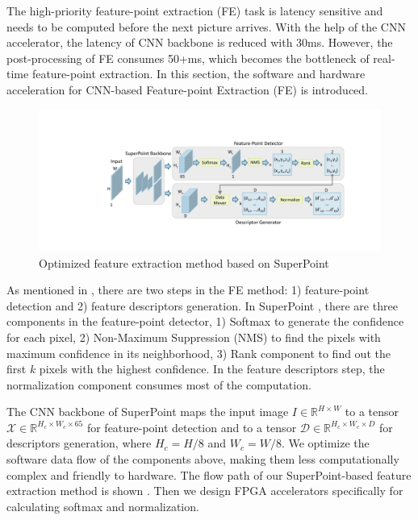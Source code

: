 \label{sec:hardsoftcodesign}
\label{subsec:FEopt}

The high-priority feature-point extraction (FE) task is latency sensitive and needs to be computed before the next picture arrives. With the help of the CNN accelerator, the latency of CNN backbone is reduced with 30ms. However, the  post-processing of FE consumes 50+ms, which becomes the bottleneck of real-time feature-point extraction. In this section, the software and hardware acceleration for CNN-based Feature-point Extraction (FE) is introduced.


\begin{figure}[t]
    \centering  
    \vspace{-0.1cm} 
    \setlength{\abovecaptionskip}{0cm} 
    \setlength{\belowcaptionskip}{-0.05cm} 
    \includegraphics[width=0.99\linewidth]{fig/superpoint.pdf}
    \caption{Optimized feature extraction method based on SuperPoint}
    \label{fig:superpoint}
\end{figure}

As mentioned in , there are two steps in the FE method: 1) feature-point detection and 2) feature descriptors generation. 
In SuperPoint \cite{detone2018superpoint}, there are three components in the feature-point detector, 1) Softmax to generate the confidence for each pixel, 2) Non-Maximum Suppression (NMS) to find the pixels with maximum confidence in its neighborhood, 3) Rank component to find out the first $k$ pixels with the highest confidence. 
In the feature descriptors step, the normalization component consumes most of the computation. 

The CNN backbone of SuperPoint maps the input image $I\in \mathbb{R}^{H\times W}$ to a tensor $\mathcal{X}\in \mathbb{R}^{H_c\times W_c\times 65}$ for feature-point detection and to a tensor $\mathcal{D}\in \mathbb{R}^{H_c\times W_c\times D}$ for descriptors generation, where $H_c = H/8$ and $W_c = W/8$.
We optimize the software data flow of the components above, making them less computationally complex and friendly to hardware. 
The flow path of our SuperPoint-based feature extraction method is shown . 
Then we design FPGA accelerators specifically for calculating softmax and normalization.

